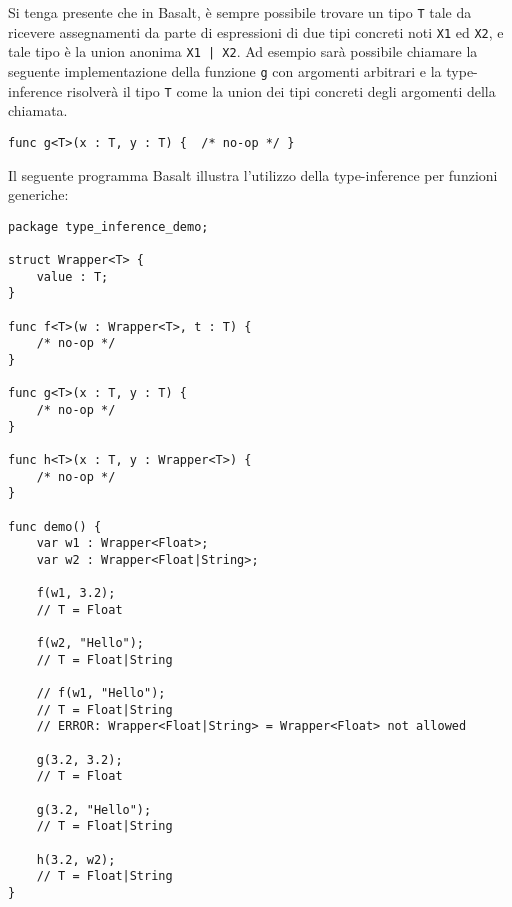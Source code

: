 Si tenga presente che in Basalt, è sempre possibile trovare un tipo \texttt{T} tale da ricevere assegnamenti da parte 
di espressioni di due tipi concreti noti \texttt{X1} ed \texttt{X2}, e tale tipo è la union anonima \texttt{X1 | X2}. Ad 
esempio sarà possibile chiamare la seguente implementazione della funzione \texttt{g} con argomenti arbitrari e 
la type-inference risolverà il tipo \texttt{T} come la union dei tipi concreti degli argomenti della chiamata. \\

\vspace{0.5cm}
\begin{lstlisting}[frame=single]
func g<T>(x : T, y : T) {  /* no-op */ }
\end{lstlisting}
\vspace{0.5cm}

\newpage

Il seguente programma Basalt illustra l'utilizzo della type-inference per 
funzioni generiche:

\vspace{0.5cm}
\begin{lstlisting}[frame=single]
package type_inference_demo;

struct Wrapper<T> {
    value : T;
}

func f<T>(w : Wrapper<T>, t : T) { 
    /* no-op */ 
} 

func g<T>(x : T, y : T) { 
    /* no-op */ 
}

func h<T>(x : T, y : Wrapper<T>) { 
    /* no-op */ 
} 

func demo() {
    var w1 : Wrapper<Float>;
    var w2 : Wrapper<Float|String>;
        
    f(w1, 3.2);     
    // T = Float
    
    f(w2, "Hello"); 
    // T = Float|String

    // f(w1, "Hello");  
    // T = Float|String 
    // ERROR: Wrapper<Float|String> = Wrapper<Float> not allowed

    g(3.2, 3.2);     
    // T = Float
    
    g(3.2, "Hello"); 
    // T = Float|String

    h(3.2, w2);      
    // T = Float|String
}
\end{lstlisting}
\vspace{0.5cm}